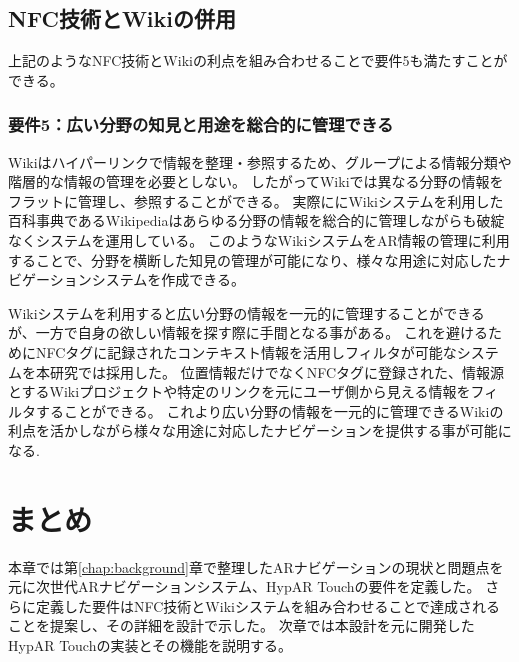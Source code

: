 \subsection{NFC技術とWikiの併用}
上記のようなNFC技術とWikiの利点を組み合わせることで要件5も満たすことができる。

\subsubsection*{要件5：広い分野の知見と用途を総合的に管理できる}
Wikiはハイパーリンクで情報を整理・参照するため、グループによる情報分類や階層的な情報の管理を必要としない。
したがってWikiでは異なる分野の情報をフラットに管理し、参照することができる。
実際ににWikiシステムを利用した百科事典であるWikipediaはあらゆる分野の情報を総合的に管理しながらも破綻なくシステムを運用している。
このようなWikiシステムをAR情報の管理に利用することで、分野を横断した知見の管理が可能になり、様々な用途に対応したナビゲーションシステムを作成できる。

Wikiシステムを利用すると広い分野の情報を一元的に管理することができるが、一方で自身の欲しい情報を探す際に手間となる事がある。
これを避けるためにNFCタグに記録されたコンテキスト情報を活用しフィルタが可能なシステムを本研究では採用した。
位置情報だけでなくNFCタグに登録された、情報源とするWikiプロジェクトや特定のリンクを元にユーザ側から見える情報をフィルタすることができる。
これより広い分野の情報を一元的に管理できるWikiの利点を活かしながら様々な用途に対応したナビゲーションを提供する事が可能になる.



\section{まとめ}
本章では第\ref{chap:background}章で整理したARナビゲーションの現状と問題点を元に次世代ARナビゲーションシステム、HypAR Touchの要件を定義した。
さらに定義した要件はNFC技術とWikiシステムを組み合わせることで達成されることを提案し、その詳細を設計で示した。
次章では本設計を元に開発したHypAR Touchの実装とその機能を説明する。







